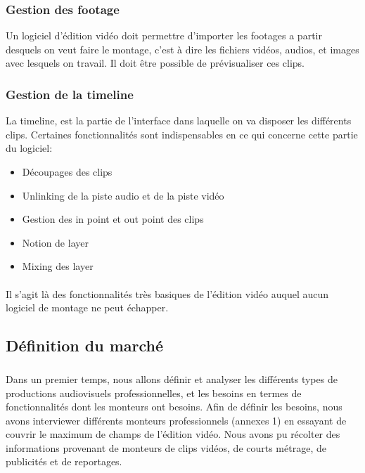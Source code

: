 \subsubsection{Gestion des footage}
Un logiciel d'édition vidéo doit permettre d'importer les footages a partir
desquels on veut faire le montage, c'est à dire les fichiers vidéos, audios,
et images avec lesquels on travail. Il doit être possible de prévisualiser ces
clips.

\subsubsection{Gestion de la timeline}
La timeline, est la partie de l'interface dans laquelle on va disposer les
différents clips. Certaines fonctionnalités sont indispensables en ce qui
concerne cette partie du logiciel:
\begin{itemize}
  \item{Découpages des clips}
  \item{Unlinking de la piste audio et de la piste vidéo}
  \item{Gestion des in point et  out point des clips} %
  \item{Notion de layer}
  \item{Mixing des layer}
\end{itemize}

\paragraph{}
Il s'agit là des fonctionnalités très basiques de l'édition vidéo auquel
aucun logiciel de montage ne peut échapper.

\subsection{Définition du marché}

\subparagraph{}
Dans un premier temps, nous allons définir et analyser les
différents types de productions audiovisuels professionnelles,
et les besoins en termes de fonctionnalités dont les monteurs
ont besoins. Afin de définir les besoins, nous avons interviewer
différents monteurs professionnels (annexes 1) en essayant de
couvrir le maximum de champs de l'édition vidéo. Nous
avons pu récolter des informations provenant de monteurs de clips
vidéos, de courts métrage, de publicités et de reportages.

